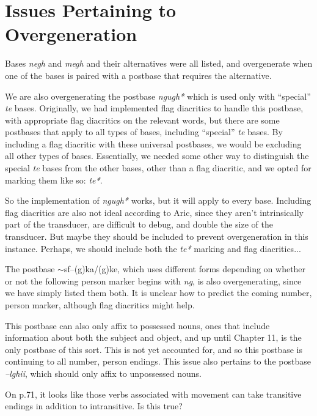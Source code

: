 \documentclass{article}
\begin{document}
\section{Issues Pertaining to Overgeneration}

\item Bases \textit{negh} and \textit{megh} and their alternatives were all listed, and overgenerate when one of the bases is paired with a postbase that requires the alternative.

\item We are also overgenerating the postbase \textit{ngugh*} which is used only with ``special'' \textit{te} bases.
%
Originally, we had implemented flag diacritics to handle this postbase, with appropriate flag diacritics on the relevant words, but there are some postbases that apply to all types of bases, including ``special'' \textit{te} bases.
%
By including a flag diacritic with these universal postbases, we would be excluding all other types of bases.
%
Essentially, we needed some other way to distinguish the special \textit{te} bases from the other bases, other than a flag diacritic, and we opted for marking them like so: \textit{te*}.

So the implementation of \textit{ngugh*} works, but it will apply to every base.
%
Including flag diacritics are also not ideal according to Aric, since they aren't intrinsically part of the transducer, are difficult to debug, and double the size of the transducer.
%
But maybe they should be included to prevent overgeneration in this instance.
%
Perhaps, we should include both the \textit{te*} marking and flag diacritics...

\item The postbase $\sim$sf--(g)ka/(g)ke, which uses different forms depending on whether or not the following person marker begins with \textit{ng}, is also overgenerating, since we have simply listed them both.
%
It is unclear how to predict the coming number, person marker, although flag diacritics might help.

This postbase can also only affix to possessed nouns, ones that include information about both the subject and object, and up until Chapter 11, is the only postbase of this sort.
%
This is not yet accounted for, and so this postbase is continuing to all number, person endings.
%
This issue also pertains to the postbase \textit{--lghii}, which should only affix to unpossessed nouns.

\item On p.71, it looks like those verbs associated with movement can take transitive endings in addition to intransitive.
%
Is this true?
\end{document}
